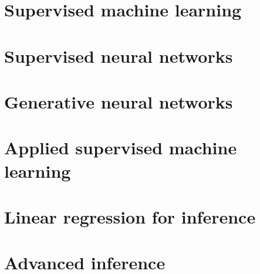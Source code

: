 \documentclass[oneside]{book}
\begin{document}
\part{Supervised machine learning}


















\part{Supervised neural networks}











\part{Generative neural networks}





\part{Applied supervised machine learning}





\part{Linear regression for inference}






\part{Advanced inference}








\end{document}
